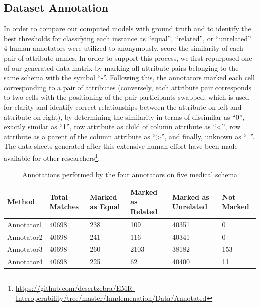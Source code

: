 \documentclass{ieeeaccess}
\begin{document}
\subsection{Dataset Annotation}
In order to compare our computed models with ground truth and to identify the best thresholds for classifying each instance as ``equal'', ``related'', or ``unrelated'' 4 human annotators were utilized to anonymously, score the similarity of each pair of attribute names. In order to support this process, we first repurposed one of our generated data matrix by marking all attribute pairs belonging to the same schema with the symbol ``-''. Following this, the annotators marked each cell corresponding to a pair of attributes (conversely, each attribute pair corresponds to two cells with the positioning of the pair-participants swapped; which is used for clarity and identify correct relationships between the attribute on left and attribute on right), by determining the similarity in terms of dissimilar as ``0'', exactly similar as ``1'', row attribute as child of column attribute as ``<'', row attribute as a parent of the column attribute as ``>'', and finally, unknown as ``~''. The data sheets generated after this extensive human effort have been made available for other researchers\footnote{\url{https://github.com/desertzebra/EMR-Interoperability/tree/master/Implemenation/Data/Annotated}}.

\begin{table}
	\centering
	\caption{Annotations performed by the four annotators on five medical schema}
	\label{tab:annotator_marking}
	\begin{tabular}{|l|l|l|l|l|l|}
		\hline
		Method     & Total Matches & Marked as Equal & Marked as Related & Marked as Unrelated & Not Marked \\ \hline
		Annotator1 & 40698         & 238             & 109               & 40351               & 0          \\
		Annotator2 & 40698         & 241             & 116               & 40341               & 0          \\
		Annotator3 & 40698         & 260             & 2103              & 38182               & 153        \\
		Annotator4 & 40698         & 225             & 62                & 40400               & 11         \\ \hline
	\end{tabular}
\end{table}
\end{document}
